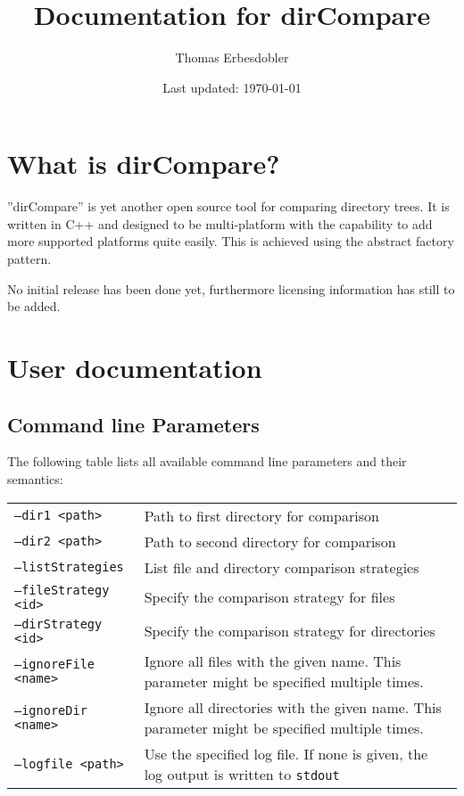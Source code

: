 \documentclass[a4paper]{article}
\title{Documentation for dirCompare}
\author{Thomas Erbesdobler}
\date{Last updated: \today}
\begin{document}
	\maketitle
	\tableofcontents
	
	\section{What is dirCompare?}
	\label{sec:what_is_dircompare}
	
	''dirCompare'' is yet another open source tool for comparing directory trees. It is written in C++ and designed to be multi-platform with the capability to add more supported platforms quite easily. This is achieved using the abstract factory pattern.
	
	\noindent
	No initial release has been done yet, furthermore licensing information has still to be added.
	
	\section{User documentation}
	\label{sec:user_documentation}
	
	\subsection{Command line Parameters}
	\label{subsec:command_line_parameters}
	
	The following table lists all available command line parameters and their semantics:
	
	\noindent
	\begin{tabularx}{\linewidth}{l|X}
		\texttt{--dir1 \textless path\textgreater} & Path to first directory for comparison \\
		\texttt{--dir2 \textless path\textgreater} & Path to second directory for comparison \\
		\texttt{--listStrategies} & List file and directory comparison strategies \\
		\texttt{--fileStrategy \textless id\textgreater} & Specify the comparison strategy for files \\
		\texttt{--dirStrategy \textless id\textgreater} & Specify the comparison strategy for directories \\
		\texttt{--ignoreFile \textless name\textgreater} & Ignore all files with the given name. This parameter might be specified multiple times. \\
		\texttt{--ignoreDir \textless name\textgreater} & Ignore all directories with the given name. This parameter might be specified multiple times. \\
		\texttt{--logfile \textless path\textgreater} & Use the specified log file. If none is given, the log output is written to \texttt{stdout} \\
	\end{tabularx}
	
\end{document}
